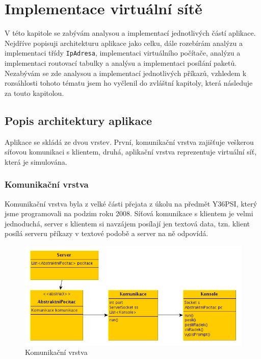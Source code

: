
\chapter{Implementace virtuální sítě}

V této kapitole se zabývám analysou a implementací jednotlivých částí aplikace. Nejdříve popisuji architekturu aplikace jako celku, dále rozebírám analýzu a implementaci třídy \verb|IpAdresa|, implementaci virtuálního počítače, analýzu a implementaci routovací tabulky a analýsu a implementaci posílání paketů. Nezabývám se zde analysou a implementací jednotlivých příkazů, vzhledem k rozsáhlosti tohoto tématu jsem ho vyčlenil do zvláštní kapitoly, která následuje za touto kapitolou.




\section{Popis architektury aplikace}

Aplikace se skládá ze dvou vrstev. První, komunikační vrstva zajišťuje veškerou síťovou komunikaci s klientem, druhá, aplikační vrstva reprezentuje virtuální síť, která je simulována. 


\subsection{Komunikační vrstva}\label{impl_komunikacni_vrstva}

Komunikační vrstva byla z velké části přejata z úkolu na předmět Y36PSI, který jsme programovali na podzim roku 2008. Síťová komunikace s klientem je velmi jednoduchá, server s klientem si navzájem posílají jen textová data, tzn. klient posílá serveru příkazy v textové podobě a server na ně odpovídá.

\begin{figure}[h]
\begin{center}
\includegraphics[width=14cm]{obrazky/komunikacni_vrstva}
\caption{Komunikační vrstva}
\label{obr_komunikacni_vrstva}
\end{center}
\end{figure}

